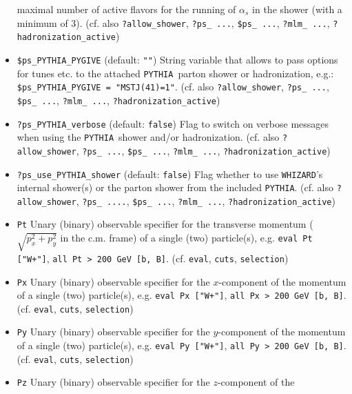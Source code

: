 \documentclass[12pt]{book}
\newcommand{\ttt}[1]{\texttt{#1}}
\newcommand{\whizard}{\texttt{WHIZARD}}
\newcommand{\pythia}{\texttt{PYTHIA}}
\begin{document}
\begin{itemize}
maximal number of active flavors for the running of $\alpha_s$ in the
shower (with a minimum of 3). (cf. also \ttt{?allow\_shower}, \ttt{?ps\_
...}, \ttt{\$ps\_ ...}, \ttt{?mlm\_ ...},
\ttt{?hadronization\_active})
\item
\ttt{\$ps\_PYTHIA\_PYGIVE} \qquad (default: \ttt{""}) \newline
String variable that allows to pass options for tunes etc. to the
attached \pythia\ parton shower or hadronization, e.g.:
\ttt{\$ps\_PYTHIA\_PYGIVE = "MSTJ(41)=1"}.  (cf. also
\newline \ttt{?allow\_shower}, \ttt{?ps\_ ...}, \ttt{\$ps\_ ...}, \ttt{?mlm\_
...}, \ttt{?hadronization\_active})
\item
\ttt{?ps\_PYTHIA\_verbose} \qquad (default: \ttt{false}) \newline
Flag to switch on verbose messages when using the \pythia\ shower
and/or hadronization. (cf. also \ttt{?allow\_shower}, \ttt{?ps\_
...}, \ttt{\$ps\_ ...}, \ttt{?mlm\_ ...}, \ttt{?hadronization\_active})  
\item
\ttt{?ps\_use\_PYTHIA\_shower} \qquad (default: \ttt{false}) \newline
Flag whether to use \whizard's internal shower(s) or the parton
shower from the included \pythia. (cf. also \ttt{?allow\_shower}, \ttt{?ps\_
  ....}, \ttt{\$ps\_ ...}, \ttt{?mlm\_ ...}, \newline
\ttt{?hadronization\_active}) 
\item
\ttt{Pt} \newline
Unary (binary) observable specifier for the transverse momentum
($\sqrt{p_x^2 + p_y^2}$ in the c.m. frame) of a single (two)
particle(s), e.g. \ttt{eval Pt ["W+"]}, \ttt{all Pt > 200 GeV [b,
B]}. (cf. \ttt{eval}, \ttt{cuts}, \ttt{selection})
\item
\ttt{Px} \newline
Unary (binary) observable specifier for the $x$-component of the
momentum of a single (two) particle(s), e.g. \ttt{eval Px ["W+"]},
\ttt{all Px > 200 GeV [b, B]}. (cf. \ttt{eval}, \ttt{cuts},
\ttt{selection})
\item
\ttt{Py} \newline
Unary (binary) observable specifier for the $y$-component of the
momentum of a single (two) particle(s), e.g. \ttt{eval Py ["W+"]},
\ttt{all Py > 200 GeV [b, B]}. (cf. \ttt{eval}, \ttt{cuts},
\ttt{selection})
\item
\ttt{Pz} \newline
Unary (binary) observable specifier for the $z$-component of the

\end{itemize}
\end{document}
